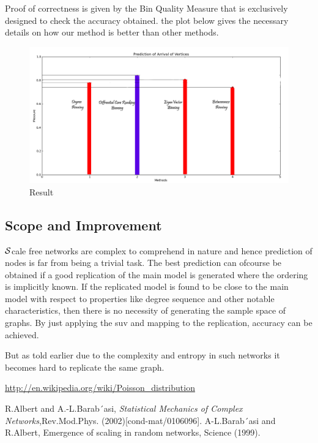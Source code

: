 \documentclass{article}
\begin{document}
Proof of correctness is given by the Bin Quality Measure that is exclusively designed to check the accuracy obtained. the plot below gives the necessary details on how our method is better than other methods.

\begin{figure}[htp]
\centering
\includegraphics[scale=0.3]{Figures/results1a.jpg}
\caption{Result }
\label{}
\end{figure}

\subsection{Scope and Improvement} 

\hspace{.18in}$\cal S$cale free networks are complex to comprehend in nature and hence prediction of nodes is far from being a trivial task. The best prediction can ofcourse be obtained if a good replication of the main model is generated where the ordering is implicitly known. If the replicated model is found to be close to the main model with respect to properties like degree sequence and other notable characteristics, then there is no necessity of generating the sample space of graphs. By just applying the suv and mapping to the replication, accuracy can be achieved.

But as told earlier due to the complexity and entropy in such networks it becomes hard to replicate the same graph.


\begin{thebibliography}{1}

 \url{http://en.wikipedia.org/wiki/Poisson_distribution}

 R.Albert and A.-L.Barab´asi, \emph{Statistical Mechanics of Complex Networks},Rev.Mod.Phys. (2002)[cond-mat/0106096].
 A-L.Barab´asi and R.Albert, Emergence of scaling in random networks, Science (1999).

\end{thebibliography}	
\end{document}
